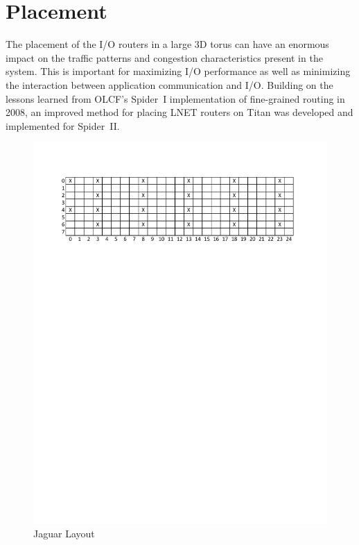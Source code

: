 \section{Placement}

The placement of the I/O routers in a large 3D torus can have an enormous impact
on the traffic patterns and congestion characteristics present in the system.
This is important for maximizing I/O performance as well as minimizing the
interaction between application communication and I/O. Building on the lessons
learned from OLCF's Spider~I implementation of fine-grained routing in 2008, an
improved method for placing LNET routers on Titan was developed and implemented
for Spider~II.

\begin{figure}[t]
  \begin{center}
    \includegraphics{figures/jaguarplacement}
    \caption{Jaguar Layout}\label{fig:jaglayout}
  \end{center}
\end{figure}


